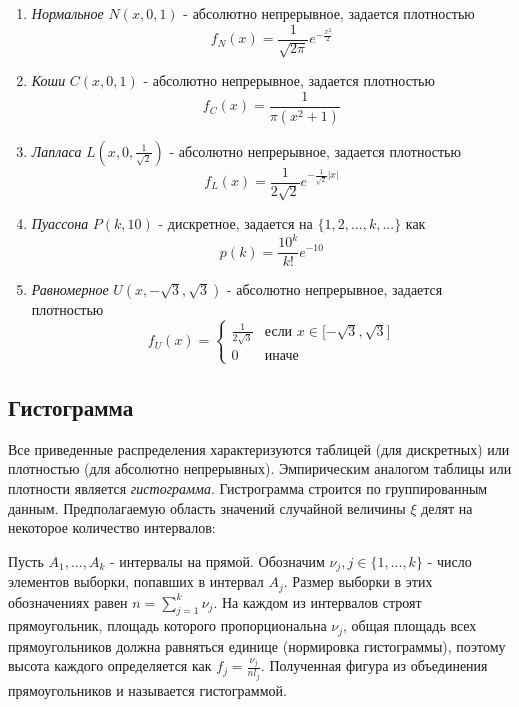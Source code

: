 \documentclass[12pt,a4paper]{article}
\begin{document}
\begin{enumerate}
	\item \textit{Нормальное} $N(x, 0, 1)$ - абсолютно непрерывное, задается плотностью
	$$f_N(x)=\frac{1}{\sqrt{2\pi}}e^{-\frac{x^2}{2}}$$
	
	\item \textit{Коши} $C(x, 0, 1)$ - абсолютно непрерывное, задается плотностью
	$$f_C(x)=\frac{1}{\pi(x^2+1)}$$
	
	\item \textit{Лапласа} $L(x, 0, \frac{1}{\sqrt{2}})$ - абсолютно непрерывное, задается плотностью
	$$f_L(x)=\frac{1}{2\sqrt{2}}e^{-\frac{1}{\sqrt{2}}|x|}$$
	
	\item \textit{Пуассона} $P(k, 10)$ - дискретное, задается на $\{1, 2, ..., k, ...\}$ как $$p(k)=\frac{10^k}{k!}e^{-10}$$ 
	
	\item \textit{Равномерное} $U(x, -\sqrt{3}, \sqrt{3})$ - абсолютно непрерывное, задается плотностью 
	\begin{equation*}
	f_U(x) = 
	\begin{cases}
	\frac{1}{2\sqrt{3}} &\text{если $x \in \mathopen[-\sqrt{3}, \sqrt{3}\mathclose] $}\\
	0 &\text{иначе}
	\end{cases}
	\end{equation*}	
\end{enumerate}

\subsection{Гистограмма}
Все приведенные распределения характеризуются таблицей (для дискретных) или плотностью (для абсолютно непрерывных). Эмпирическим аналогом таблицы или плотности является \textit{гистограмма}\cite{chernova}. Гистрограмма строится по группированным данным. Предполагаемую область значений случайной величины $\xi$ делят на некоторое количество интервалов:

Пусть $A_1, ..., A_k$ - интервалы на прямой. Обозначим $\nu_j,j\in\{1, ..., k\}$ - число элементов выборки, попавших в интервал $A_j$. Размер выборки в этих обозначениях равен $n=\sum\limits_{j=1}^{k}{\nu_j}$. На каждом из интервалов строят прямоугольник, площадь которого пропорциональна $\nu_j$, общая площадь всех прямоугольников должна равняться единице (нормировка гистограммы), поэтому высота каждого определяется как $f_j=\frac{\nu_j}{nl_j}$. Полученная фигура из объединения прямоугольников и называется гистограммой.
\pagebreak
\end{document}
